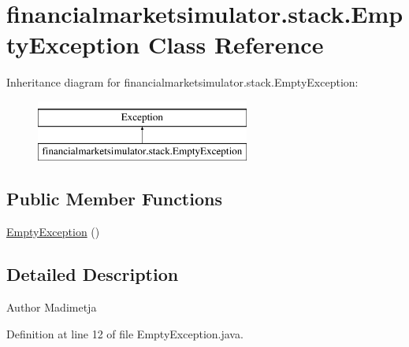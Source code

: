 \hypertarget{classfinancialmarketsimulator_1_1stack_1_1_empty_exception}{\section{financialmarketsimulator.\+stack.\+Empty\+Exception Class Reference}
\label{classfinancialmarketsimulator_1_1stack_1_1_empty_exception}
}
Inheritance diagram for financialmarketsimulator.\+stack.\+Empty\+Exception\+:\begin{figure}[H]
\begin{center}
\leavevmode
\includegraphics[height=2.000000cm]{classfinancialmarketsimulator_1_1stack_1_1_empty_exception}
\end{center}
\end{figure}
\subsection*{Public Member Functions}
\begin{DoxyCompactItemize}
\item 
\hyperlink{classfinancialmarketsimulator_1_1stack_1_1_empty_exception_ac89be1a9a37af8d039c3c47599fb35c6}{Empty\+Exception} ()
\end{DoxyCompactItemize}


\subsection{Detailed Description}
\begin{DoxyAuthor}{Author}
Madimetja 
\end{DoxyAuthor}


Definition at line 12 of file Empty\+Exception.\+java.



